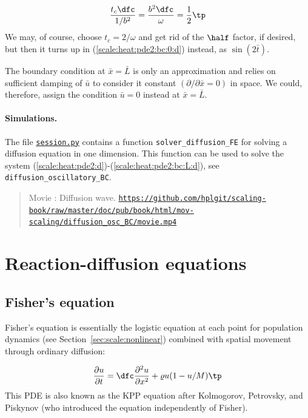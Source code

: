 \documentclass[graybox,envcountchap,sectrefs,final]{svmonodo}
\newenvironment{doconce:movie}{}{}
\newcounter{doconce:movie:counter}
\begin{document}
\[ \frac{t_c\dfc}{1/b^2} = \frac{b^2\dfc}{\omega}
= \frac{1}{2}\tp\]
We may, of course, choose $t_c=2/\omega$ and get rid of the $\half$ factor,
if desired, but then it turns up in (\ref{scale:heat:pde2:bc:0:d}) instead,
as $\sin (2\bar t)$.

The boundary condition at $\bar x=\bar L$ is only an approximation and
relies on sufficient damping of $\bar u$ to consider it constant
$(\partial/\partial\bar x =0)$ in
space. We could, therefore, assign the condition $\bar u = 0$ instead
at $\bar x=\bar L$.

\paragraph{Simulations.}
The file \href{{http://tinyurl.com/o8pb3yy/session.py}}{\nolinkurl{session.py}} contains a function
\Verb!solver_diffusion_FE! for solving a diffusion equation in one dimension.
This function can be used to solve the
system (\ref{scale:heat:pde2:d})-(\ref{scale:heat:pde2:bc:L:d}),
see \Verb!diffusion_oscillatory_BC!.


\begin{doconce:movie}
\begin{quote}
Movie : Diffusion wave. \href{https://github.com/hplgit/scaling-book/raw/master/doc/pub/book/html/mov-scaling/diffusion_osc_BC/movie.mp4}{\nolinkurl{https://github.com/hplgit/scaling-book/raw/master/doc/pub/book/html/mov-scaling/diffusion_osc_BC/movie.mp4}}
\end{quote}
\end{doconce:movie}




\section{Reaction-diffusion equations}
\label{sec:scale:diffu:Fisher}

\subsection{Fisher's equation}

Fisher's equation is essentially the logistic equation at each point
for population dynamics (see Section~\ref{sec:scale:nonlinear})
combined with spatial movement through ordinary diffusion:

\begin{equation}
\frac{\partial u}{\partial t} =
\dfc\frac{\partial^2 u}{\partial x^2} + \varrho u(1-u/M)
\tp
\label{sec:scale:diffu:Fisher:pde}
\end{equation}
This PDE is also known as the KPP equation after
Kolmogorov, Petrovsky, and Piskynov (who introduced the equation
independently of Fisher).
\end{document}
